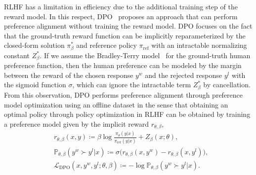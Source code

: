 RLHF has a limitation in efficiency due to the additional training step of the reward model. In this respect, DPO~\cite{rafailov2023direct} proposes an approach that can perform preference alignment without training the reward model. DPO focuses on the fact that the ground-truth reward function can be implicitly reparameterized by the closed-form solution $\pi^*_\beta$ and reference policy $\pi_{\text{ref}}$ with an intractable normalizing constant $Z^*_\beta$. If we assume the Bradley-Terry model~\cite{bradley1952rank} for the ground-truth human preference function, then the human preference can be modeled by the margin between the reward of the chosen response $y^w$ and the rejected response $y^l$ with the sigmoid function $\sigma$, which can ignore the intractable term $Z^*_\beta$ by cancellation. From this observation, DPO performs preference alignment through preference model optimization using an offline dataset in the sense that obtaining an optimal policy through policy optimization in RLHF can be obtained by training a preference model given by the implicit reward $r_{\theta, \beta}$,
\begin{equation*}
\begin{split}
& r_{\theta, \beta}(x, y) \coloneqq \beta \log \frac{ \pi_{\theta} (y | x)}{\pi_{\text{ref}} (y | x)} + Z_\beta(x;\theta), \\
& \mathbb{P}_{\theta, \beta}(y^w \succ y^l | x) \coloneqq \sigma \big( r_{\theta, \beta}(x, y^w) - r_{\theta, \beta}(x, y^l) \big), \\
& \mathcal{L}_{\text{DPO}}(x, y^w, y^l; \theta, \beta) \coloneqq - \log \mathbb{P}_{\theta, \beta}(y^w \succ y^l | x). \\
\end{split}
\end{equation*}